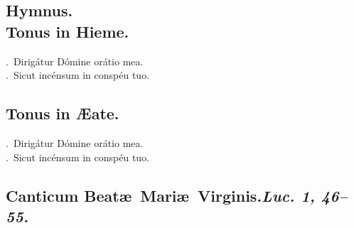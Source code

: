 \documentclass[12pt]{article} %
\newenvironment{response}{\leftskip 0in \setlength{\parindent}{0in}}{\vspace{2 mm}}
\let\oldVbar\Vbar
\renewcommand{\Vbar}{\textcolor{benred8}{\oldVbar .}}
\let\oldRbar\Rbar
\renewcommand{\Rbar}{\textcolor{benred8}{\oldRbar .}}
\def\capitulumSpace{\hspace{20 mm}}
\begin{document}
\subsection*{Hymnus.\\Tonus in Hieme.}


\gresetfirstlineaboveinitial{\small \textsc{ \textbf{\textcolor{benred8}{VIII}}}}{\small \textsc{ \textbf{\textcolor{benred8}{VIII}}}}

\begin{response}
\Vbar\ Dirig\'{a}tur D\'{o}mine or\'{a}tio mea.\\
\Rbar\ Sicut inc\'{e}nsum in consp\'{e}u tuo.

\end{response}


\subsection*{}

\subsection*{Tonus in \AE {}ate.}


\gresetfirstlineaboveinitial{\small \textsc{ \textbf{\textcolor{benred8}{I}}}}{\small \textsc{ \textbf{\textcolor{benred8}{I}}}}

\begin{response}
\Vbar\ Dirig\'{a}tur D\'{o}mine or\'{a}tio mea.\\
\Rbar\ Sicut inc\'{e}nsum in consp\'{e}u tuo.

\end{response}


\subsection*{}

\subsection*{Canticum Beat\ae\ Mari\ae\ Virginis.\capitulumSpace \emph{Luc. 1, 46--55.}}
\end{document}
